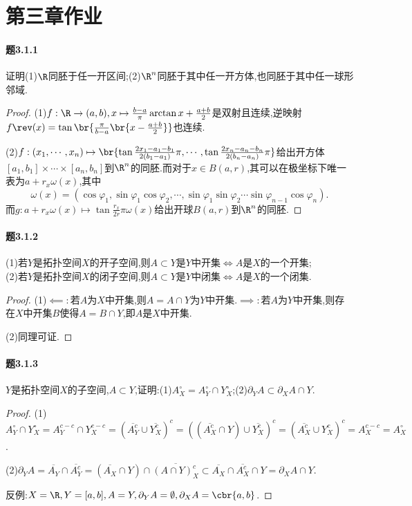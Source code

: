 \documentclass{article}
\begin{document}
\section{第三章作业}

\paragraph{题3.1.1}证明(1)$\R$同胚于任一开区间;(2)$\R^n$同胚于其中任一开方体,也同胚于其中任一球形邻域.
\begin{proof}
    (1)$f:\R\to (a,b), x\mapsto \frac{b-a}{\pi}\arctan x+\frac{a+b}{2}$是双射且连续,逆映射$f\rev(x)=\tan\br{\frac{\pi}{b-a}\br{x-\frac{a+b}{2}}}$也连续.

    (2)$f:(x_1,\cdots,x_n)\mapsto \br{\tan\frac{2x_1-a_1-b_1}{2(b_1-a_1)}\pi,\cdots,\tan\frac{2x_n-a_n-b_n}{2(b_n-a_n)}\pi}$给出开方体$[a_1,b_1]\times\cdots\times[a_n,b_n]$到$\R^n$的同胚.而对于$x\in B(a,r)$,其可以在极坐标下唯一表为$a+r_x\omega(x)$,其中$$\omega(x)=(\cos\varphi_1,\sin\varphi_1\cos\varphi_2,\cdots,\sin\varphi_1\sin\varphi_2\cdots\sin\varphi_{n-1}\cos\varphi_n).$$
    而$g:a+r_x\omega(x)\mapsto \tan\frac{r_x}{2r}\pi\omega(x)$给出开球$B(a,r)$到$\R^n$的同胚.
\end{proof}

\paragraph{题3.1.2}(1)若$Y$是拓扑空间$X$的开子空间,则$A\subset Y$是$Y$中开集$\iff A$是$X$的一个开集;\\
(2)若$Y$是拓扑空间$X$的闭子空间,则$A\subset Y$是$Y$中闭集$\iff A$是$X$的一个闭集.
\begin{proof}
    (1)$\impliedby:$若$A$为$X$中开集,则$A=A\cap Y$为$Y$中开集.$\implies:$若$A$为$Y$中开集,则存在$X$中开集$B$使得$A=B\cap Y$,即$A$是$X$中开集.

    (2)同理可证.
\end{proof}

\paragraph{题3.1.3}$Y$是拓扑空间$X$的子空间,$A\subset Y$,证明:(1)$A_X^\circ=A_Y^\circ\cap Y_X^\circ$;(2)$\partial_Y A\subset \partial_X A\cap Y$.
\begin{proof}
    (1)$A_Y^\circ\cap Y_X^\circ=A_Y^{c-c}\cap Y_X^{c-c}=(\overline{A_Y^c}\cup \overline{Y_X^c})^c=((\overline{A_X^c}\cap Y)\cup \overline{Y_X^c})^c=(\overline{A_X^c}\cup Y_X^c)^c=A_X^{c-c}=A_X^\circ$.

    (2)$\partial_Y A=\overline{A_Y}\cap\overline{A^c_Y}=(\overline{A_X}\cap Y)\cap \overline{(A\cap Y)_X^c}\subset \overline{A_X}\cap \overline{A_X^c}\cap Y=\partial_X A\cap Y$.

    反例:$X=\R, Y=[a,b], A=Y, \partial_Y A=\emptyset, \partial_X A=\cbr{a,b}$.
\end{proof}
\end{document}
